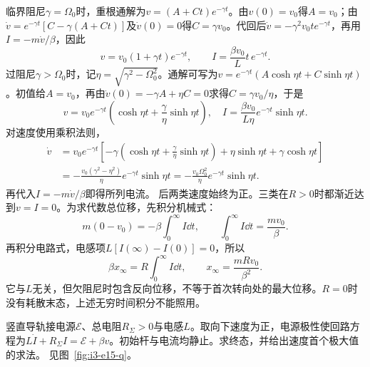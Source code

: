 \begin{solution}
临界阻尼$\gamma=\Omega_0$时，重根通解为$v=(A+Ct)e^{-\gamma t}$。由$v(0)=v_0$得$A=v_0$；由$\dot v=e^{-\gamma t}[C-\gamma(A+Ct)]$及$\dot v(0)=0$得$C=\gamma v_0$。代回后$\dot v=-\gamma^2v_0t e^{-\gamma t}$，再用$I=-m\dot v/\beta$，因此
\[
v=v_0(1+\gamma t)e^{-\gamma t},\qquad
I=\frac{\beta v_0}{L}t\,e^{-\gamma t}.
\]
过阻尼$\gamma>\Omega_0$时，记$\eta=\sqrt{\gamma^2-\Omega_0^2}$。通解可写为$v=e^{-\gamma t}(A\cosh\eta t+C\sinh\eta t)$。初值给$A=v_0$，再由$\dot v(0)=-\gamma A+\eta C=0$求得$C=\gamma v_0/\eta$，于是
\[
v=v_0e^{-\gamma t}
\left(\cosh\eta t+\frac{\gamma}{\eta}\sinh\eta t\right),\quad
I=\frac{\beta v_0}{L\eta}e^{-\gamma t}\sinh\eta t.
\]
对速度使用乘积法则，
\[\begin{aligned}
\dot v&=v_0e^{-\gamma t}\left[-\gamma\left(\cosh\eta t+\frac\gamma\eta\sinh\eta t\right)
+\eta\sinh\eta t+\gamma\cosh\eta t\right]\\
&=-\frac{v_0(\gamma^2-\eta^2)}\eta e^{-\gamma t}\sinh\eta t
=-\frac{v_0\Omega_0^2}\eta e^{-\gamma t}\sinh\eta t.
\end{aligned}\]
再代入$I=-m\dot v/\beta$即得所列电流。
后两类速度始终为正。三类在$R>0$时都渐近达到$v=I=0$。为求代数总位移，先积分机械式：
\[
m(0-v_0)=-\beta\int_0^\infty I\dd t,
\qquad \int_0^\infty I\dd t=\frac{mv_0}{\beta}.
\]
再积分电路式，电感项$L[I(\infty)-I(0)]=0$，所以
\[
\beta x_\infty=R\int_0^\infty I\dd t,\qquad
\boxed{x_\infty=\frac{mRv_0}{\beta^2}}.
\]
它与$L$无关，但欠阻尼时包含反向位移，不等于首次转向处的最大位移。$R=0$时没有耗散末态，上述无穷时间积分不能照用。
\end{solution}

\begin{example}[重力、电源与电感共同驱动的杆]\label{ex:i3-e15}

竖直导轨接电源$\mathcal E$、总电阻$R_\Sigma>0$与电感$L$。取向下速度为正，电源极性使回路方程为$L\dot I+R_\Sigma I=\mathcal E+\beta v$。初始杆与电流均静止。求终态，并给出速度首个极大值的求法。
 见图~\ref{fig:i3-e15-q}。
\end{example}

